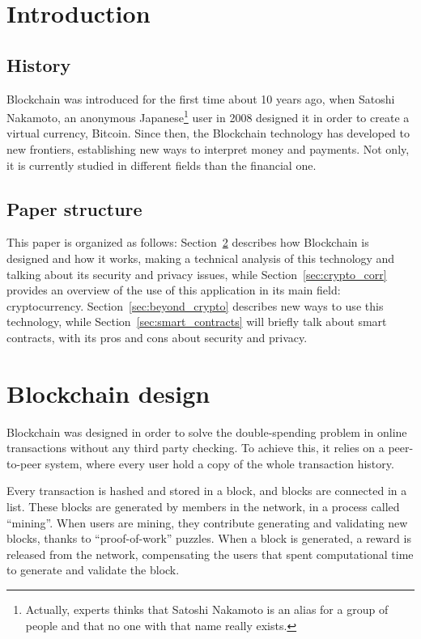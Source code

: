 \section{Introduction}

\subsection{History}
Blockchain was introduced for the first time about 10 years ago, when Satoshi
Nakamoto, an anonymous Japanese\footnote{Actually, experts thinks that Satoshi
Nakamoto is an alias for a group of people and that no one with that name
really exists.} user in 2008 designed it in order to create a virtual currency,
Bitcoin. Since then, the Blockchain technology has developed to new frontiers,
establishing new ways to interpret money and payments. Not only, it is currently
studied in different fields than the financial one.

\subsection{Paper structure}

This paper is organized as follows: Section~\ref{sec:block_design} describes
how Blockchain is designed and how it works, making a technical analysis of this
technology and talking about its security and privacy issues, while
Section~\ref{sec:crypto_corr} provides an overview of the
use of this application in its main field: cryptocurrency.
Section~\ref{sec:beyond_crypto} describes new ways to use this technology, while
Section~\ref{sec:smart_contracts} will briefly talk about smart contracts, with
its pros and cons about security and privacy.

\section{Blockchain design}
\label{sec:block_design}
Blockchain was designed in order to solve the double-spending problem in
online transactions without any third party checking\cite{nakamoto08}. To
achieve this, it relies on a peer-to-peer system, where every user hold a copy
of the whole transaction history.

Every transaction is hashed and stored in a block, and blocks are connected in
a list. These blocks are generated by members in the network, in a process
called ``mining''. When users are mining, they contribute generating and
validating new blocks, thanks to ``proof-of-work'' puzzles. When a block is
generated, a reward is released from the network, compensating the users that
spent computational time to generate and validate the block.

